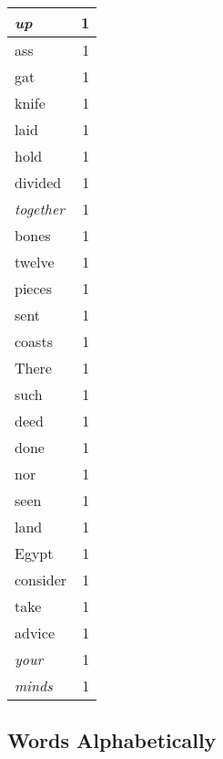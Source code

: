 \begin{center}
\begin{longtable}{l|r}
\emph{up} & 1 \\ \hline
ass & 1 \\ \hline
gat & 1 \\ \hline
knife & 1 \\ \hline
laid & 1 \\ \hline
hold & 1 \\ \hline
divided & 1 \\ \hline
\emph{together} & 1 \\ \hline
bones & 1 \\ \hline
twelve & 1 \\ \hline
pieces & 1 \\ \hline
sent & 1 \\ \hline
coasts & 1 \\ \hline
There & 1 \\ \hline
such & 1 \\ \hline
deed & 1 \\ \hline
done & 1 \\ \hline
nor & 1 \\ \hline
seen & 1 \\ \hline
land & 1 \\ \hline
Egypt & 1 \\ \hline
consider & 1 \\ \hline
take & 1 \\ \hline
advice & 1 \\ \hline
\emph{your} & 1 \\ \hline
\emph{minds} & 1 \\ \hline
\end{longtable}
\end{center}



\normalsize



\subsection{Words Alphabetically}

